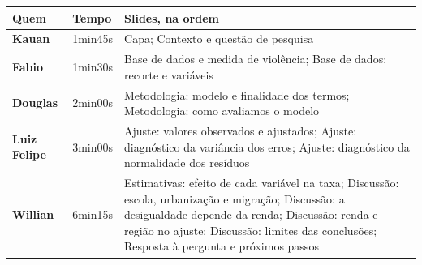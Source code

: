 \small
\begin{tabularx}{\linewidth}{@{}>{\raggedright\arraybackslash}p{2.1cm}p{1.8cm}>{\raggedright\arraybackslash}X@{}}
\toprule
\textbf{Quem} & \textbf{Tempo} & \textbf{Slides, na ordem}\\
\midrule
\textbf{Kauan} & 1min45s & Capa; Contexto e questão de pesquisa\\
\textbf{Fabio} & 1min30s & Base de dados e medida de violência; Base de dados: recorte e variáveis\\
\textbf{Douglas} & 2min00s & Metodologia: modelo e finalidade dos termos; Metodologia: como avaliamos o modelo\\
\textbf{Luiz Felipe} & 3min00s & Ajuste: valores observados e ajustados; Ajuste: diagnóstico da variância dos erros; Ajuste: diagnóstico da normalidade dos resíduos\\
\textbf{Willian} & 6min15s & Estimativas: efeito de cada variável na taxa; Discussão: escola, urbanização e migração; Discussão: a desigualdade depende da renda; Discussão: renda e região no ajuste; Discussão: limites das conclusões; Resposta à pergunta e próximos passos\\
\bottomrule
\end{tabularx}
\normalsize
